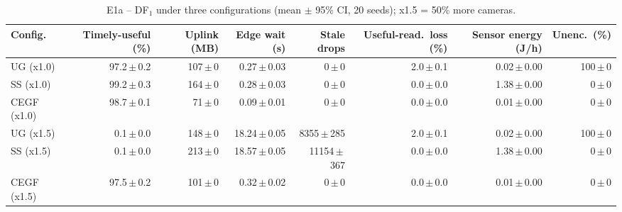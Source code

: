 \begin{table}[htbp]\scriptsize\centering
\caption{E1a -- DF$_1$ under three configurations (mean $\pm$ 95\% CI, 20 seeds); x1.5 = 50\% more cameras.}\label{tab:e1-df1}
\begin{tabular}{lrrrrrrr}
\toprule
Config. & Timely-useful (\%) & Uplink (MB) & Edge wait (s) & Stale drops & Useful-read.\ loss (\%) & Sensor energy (J/h) & Unenc.\ (\%) \\
\midrule
UG (x1.0) & 97.2\,$\pm$\,0.2 & 107\,$\pm$\,0 & 0.27\,$\pm$\,0.03 & 0\,$\pm$\,0 & 2.0\,$\pm$\,0.1 & 0.02\,$\pm$\,0.00 & 100\,$\pm$\,0 \\
SS (x1.0) & 99.2\,$\pm$\,0.3 & 164\,$\pm$\,0 & 0.28\,$\pm$\,0.03 & 0\,$\pm$\,0 & 0.0\,$\pm$\,0.0 & 1.38\,$\pm$\,0.00 & 0\,$\pm$\,0 \\
CEGF (x1.0) & 98.7\,$\pm$\,0.1 & 71\,$\pm$\,0 & 0.09\,$\pm$\,0.01 & 0\,$\pm$\,0 & 0.0\,$\pm$\,0.0 & 0.01\,$\pm$\,0.00 & 0\,$\pm$\,0 \\
UG (x1.5) & 0.1\,$\pm$\,0.0 & 148\,$\pm$\,0 & 18.24\,$\pm$\,0.05 & 8355\,$\pm$\,285 & 2.0\,$\pm$\,0.1 & 0.02\,$\pm$\,0.00 & 100\,$\pm$\,0 \\
SS (x1.5) & 0.1\,$\pm$\,0.0 & 213\,$\pm$\,0 & 18.57\,$\pm$\,0.05 & 11154\,$\pm$\,367 & 0.0\,$\pm$\,0.0 & 1.38\,$\pm$\,0.00 & 0\,$\pm$\,0 \\
CEGF (x1.5) & 97.5\,$\pm$\,0.2 & 101\,$\pm$\,0 & 0.32\,$\pm$\,0.02 & 0\,$\pm$\,0 & 0.0\,$\pm$\,0.0 & 0.01\,$\pm$\,0.00 & 0\,$\pm$\,0 \\
\bottomrule
\end{tabular}
\end{table}